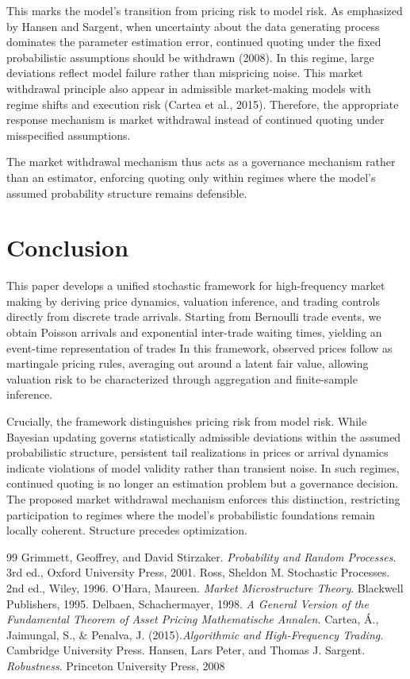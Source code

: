 \documentclass[12pt]{article}
\theoremstyle{plain}
\theoremstyle{definition}
\numberwithin{equation}{section}
\begin{document}
This marks the model's transition from pricing risk to model risk. As emphasized by Hansen and Sargent, when uncertainty about the data generating process dominates the parameter estimation error, continued quoting under the fixed probabilistic assumptions should be withdrawn (2008). In this regime, large deviations reflect model failure rather than mispricing noise. This market withdrawal principle also appear in admissible market-making models with regime shifts and execution risk (Cartea et al., 2015). Therefore, the appropriate response mechanism is market withdrawal  instead of continued quoting under misspecified assumptions.

The market withdrawal mechanism thus acts as a governance mechanism rather than an estimator, enforcing quoting only within regimes where the model's assumed probability structure remains defensible.
\section{Conclusion}
This paper develops a unified stochastic framework for high-frequency market making by deriving price dynamics, valuation inference, and trading controls directly from discrete trade arrivals. Starting from Bernoulli trade events, we obtain Poisson arrivals and exponential inter-trade waiting times, yielding an event-time representation of trades In this framework, observed prices follow as martingale pricing rules, averaging out around a latent fair value, allowing valuation risk to be characterized through aggregation and finite-sample inference.

Crucially, the framework distinguishes pricing risk from model risk. While Bayesian updating governs statistically admissible deviations within the assumed probabilistic structure, persistent tail realizations in prices or arrival dynamics indicate violations of model validity rather than transient noise. In such regimes, continued quoting is no longer an estimation problem but a governance decision. The proposed market withdrawal mechanism enforces this distinction, restricting participation to regimes where the model’s probabilistic foundations remain locally coherent. Structure precedes optimization.

\newpage
\begin{thebibliography}{99}
Grimmett, Geoffrey, and David Stirzaker. \textit{Probability and Random Processes}. 3rd ed., Oxford University Press, 2001.
Ross, Sheldon M. Stochastic Processes. 2nd ed., Wiley, 1996.
O’Hara, Maureen. \textit{Market Microstructure Theory}. Blackwell Publishers, 1995.
Delbaen, Schachermayer, 1998. \textit{A General Version of the Fundamental Theorem of Asset Pricing Mathematische Annalen.}
Cartea, Á., Jaimungal, S., \& Penalva, J. (2015).\textit{Algorithmic and High-Frequency Trading.} Cambridge University Press.
Hansen, Lars Peter, and Thomas J. Sargent. \textit{Robustness}. Princeton University Press, 2008
\end{thebibliography}
\end{document}
